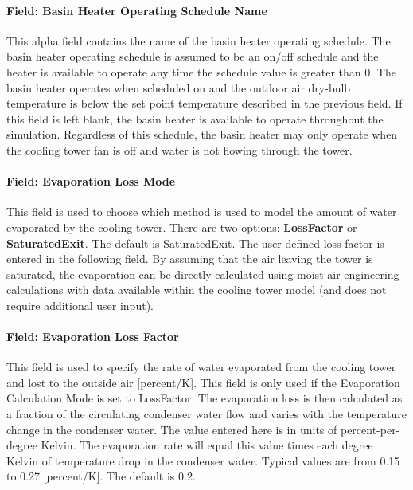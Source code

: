 \paragraph{Field: Basin Heater Operating Schedule Name}\label{field-basin-heater-operating-schedule-name-3}

This alpha field contains the name of the basin heater operating schedule. The basin heater operating schedule is assumed to be an on/off schedule and the heater is available to operate any time the schedule value is greater than 0. The basin heater operates when scheduled on and the outdoor air dry-bulb temperature is below the set point temperature described in the previous field. If this field is left blank, the basin heater is available to operate throughout the simulation. Regardless of this schedule, the basin heater may only operate when the cooling tower fan is off and water is not flowing through the tower.

\paragraph{Field: Evaporation Loss Mode}\label{field-evaporation-loss-mode-3}

This field is used to choose which method is used to model the amount of water evaporated by the cooling tower. There are two options: \textbf{LossFactor} or \textbf{SaturatedExit}. The default is SaturatedExit. The user-defined loss factor is entered in the following field. By assuming that the air leaving the tower is saturated, the evaporation can be directly calculated using moist air engineering calculations with data available within the cooling tower model (and does not require additional user input).

\paragraph{Field: Evaporation Loss Factor}\label{field-evaporation-loss-factor-3}

This field is used to specify the rate of water evaporated from the cooling tower and lost to the outside air {[}percent/K{]}. This field is only used if the Evaporation Calculation Mode is set to LossFactor. The evaporation loss is then calculated as a fraction of the circulating condenser water flow and varies with the temperature change in the condenser water. The value entered here is in units of percent-per-degree Kelvin. The evaporation rate will equal this value times each degree Kelvin of temperature drop in the condenser water. Typical values are from 0.15 to 0.27 {[}percent/K{]}. The default is 0.2.

